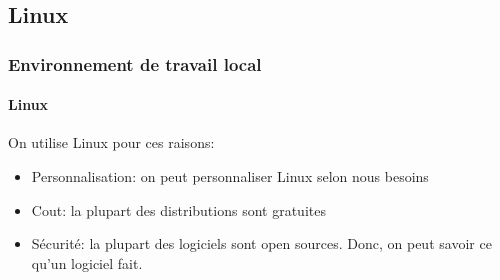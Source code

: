 \documentclass{beamer}
\begin{document}
\subsection{Linux}

\begin{frame}
\frametitle{Environnement de travail local}
\framesubtitle{Linux}

On utilise Linux pour ces raisons:
\begin{itemize}
	\item Personnalisation: on peut personnaliser Linux selon nous besoins
	\item Cout: la plupart des distributions sont gratuites
	\item Sécurité: la plupart des logiciels sont open sources. Donc, on peut savoir ce qu'un logiciel fait.
\end{itemize}

\end{frame}
\end{document}
